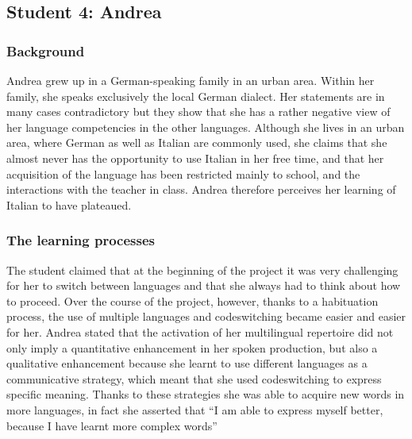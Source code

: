 \documentclass[output=paper]{../langscibook}
\begin{document}
\subsection{Student 4: Andrea}
\subsubsection{Background}
Andrea grew up in a German-speaking family in an urban area. Within her family, she speaks exclusively the local German dialect. Her statements are in many cases contradictory but they show that she has a rather negative view of her language competencies in the other languages. Although she lives in an urban area, where German as well as Italian are commonly used, she claims that she almost never has the opportunity to use Italian in her free time, and that her acquisition of the language has been restricted mainly to school, and the interactions with the teacher in class. Andrea therefore perceives her learning of Italian to have plateaued.

\subsubsection{The learning processes}

The student claimed that at the beginning of the project it was very challenging for her to switch between languages and that she always had to think about how to proceed. Over the course of the project, however, thanks to a habituation process, the use of multiple languages and codeswitching became easier and easier for her. Andrea stated that the activation of her multilingual repertoire did not only imply a quantitative enhancement in her spoken production, but also a qualitative enhancement because she learnt to use different languages as a communicative strategy, which meant that she used codeswitching to express specific meaning. Thanks to these strategies she was able to acquire new words in more languages, in fact she asserted that “I am able to express myself better, because I have learnt more complex words”
\end{document}
